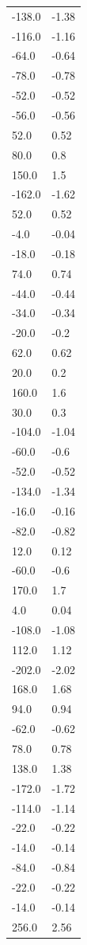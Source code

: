 \begin{longtable}{ll}
-138.0 & -1.38 \\
-116.0 & -1.16 \\
-64.0 & -0.64 \\
-78.0 & -0.78 \\
-52.0 & -0.52 \\
-56.0 & -0.56 \\
52.0 & 0.52 \\
80.0 & 0.8 \\
150.0 & 1.5 \\
-162.0 & -1.62 \\
52.0 & 0.52 \\
-4.0 & -0.04 \\
-18.0 & -0.18 \\
74.0 & 0.74 \\
-44.0 & -0.44 \\
-34.0 & -0.34 \\
-20.0 & -0.2 \\
62.0 & 0.62 \\
20.0 & 0.2 \\
160.0 & 1.6 \\
30.0 & 0.3 \\
-104.0 & -1.04 \\
-60.0 & -0.6 \\
-52.0 & -0.52 \\
-134.0 & -1.34 \\
-16.0 & -0.16 \\
-82.0 & -0.82 \\
12.0 & 0.12 \\
-60.0 & -0.6 \\
170.0 & 1.7 \\
4.0 & 0.04 \\
-108.0 & -1.08 \\
112.0 & 1.12 \\
-202.0 & -2.02 \\
168.0 & 1.68 \\
94.0 & 0.94 \\
-62.0 & -0.62 \\
78.0 & 0.78 \\
138.0 & 1.38 \\
-172.0 & -1.72 \\
-114.0 & -1.14 \\
-22.0 & -0.22 \\
-14.0 & -0.14 \\
-84.0 & -0.84 \\
-22.0 & -0.22 \\
-14.0 & -0.14 \\
256.0 & 2.56 \\

\end{longtable}
